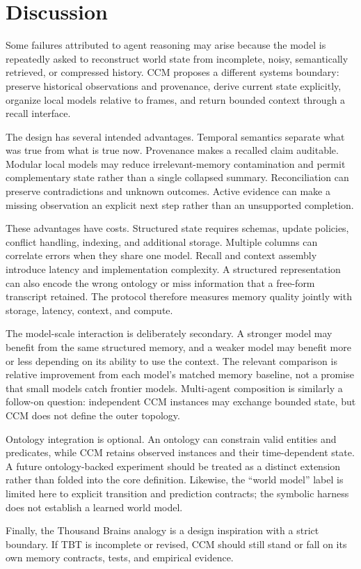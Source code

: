 \section{Discussion}

Some failures attributed to agent reasoning may arise because the model is repeatedly asked to reconstruct world state from incomplete, noisy, semantically retrieved, or compressed history. CCM proposes a different systems boundary: preserve historical observations and provenance, derive current state explicitly, organize local models relative to frames, and return bounded context through a recall interface.

The design has several intended advantages. Temporal semantics separate what was true from what is true now. Provenance makes a recalled claim auditable. Modular local models may reduce irrelevant-memory contamination and permit complementary state rather than a single collapsed summary. Reconciliation can preserve contradictions and unknown outcomes. Active evidence can make a missing observation an explicit next step rather than an unsupported completion.

These advantages have costs. Structured state requires schemas, update policies, conflict handling, indexing, and additional storage. Multiple columns can correlate errors when they share one model. Recall and context assembly introduce latency and implementation complexity. A structured representation can also encode the wrong ontology or miss information that a free-form transcript retained. The protocol therefore measures memory quality jointly with storage, latency, context, and compute.

The model-scale interaction is deliberately secondary. A stronger model may benefit from the same structured memory, and a weaker model may benefit more or less depending on its ability to use the context. The relevant comparison is relative improvement from each model's matched memory baseline, not a promise that small models catch frontier models. Multi-agent composition is similarly a follow-on question: independent CCM instances may exchange bounded state, but CCM does not define the outer topology.

Ontology integration is optional. An ontology can constrain valid entities and predicates, while CCM retains observed instances and their time-dependent state. A future ontology-backed experiment should be treated as a distinct extension rather than folded into the core definition. Likewise, the ``world model'' label is limited here to explicit transition and prediction contracts; the symbolic harness does not establish a learned world model.

Finally, the Thousand Brains analogy is a design inspiration with a strict boundary. If TBT is incomplete or revised, CCM should still stand or fall on its own memory contracts, tests, and empirical evidence.
